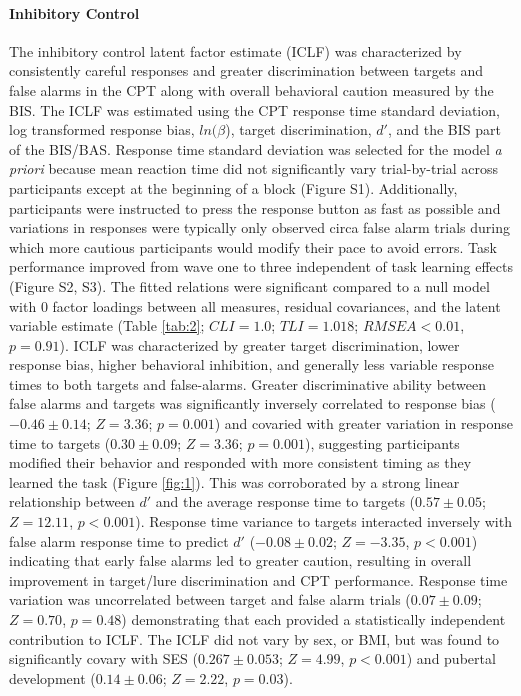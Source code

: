 \documentclass[utf8]{frontiersSCNS} %
\begin{document}
\paragraph{Inhibitory Control} 
The inhibitory control latent factor estimate (ICLF) was characterized by consistently careful responses and greater discrimination between targets and false alarms in the CPT along with overall behavioral caution measured by the BIS. The ICLF  was estimated using the CPT response time standard deviation, log transformed response bias, $ln(\beta$), target discrimination, $d'$, and the BIS part of the BIS/BAS. Response time standard deviation was selected for the model \textit{a priori} because mean reaction time did not significantly vary trial-by-trial across participants except at the beginning of a block (Figure S1). Additionally, participants were instructed to press the response button as fast as possible and variations in responses were typically only observed circa false alarm trials during which more cautious participants would modify their pace to avoid errors. Task performance improved from wave one to three independent of task learning effects (Figure S2, S3). The fitted relations were significant compared to a null model with 0 factor loadings between all measures, residual covariances, and the latent variable estimate (Table \ref{tab:2}; $CLI = 1.0$; $TLI = 1.018$; $RMSEA < 0.01$, $p = 0.91$). ICLF was characterized by greater target discrimination, lower response bias, higher behavioral inhibition, and generally less variable response times to both targets and false-alarms. Greater discriminative ability between false alarms and targets was significantly inversely correlated to response bias ($-0.46\pm0.14$; $Z=3.36$; $p=0.001$) and covaried with greater variation in response time to targets ($0.30\pm0.09$; $Z=3.36$; $p=0.001$), suggesting participants modified their behavior and responded with more consistent timing as they learned the task (Figure \ref{fig:1}). This was corroborated by a strong linear relationship between $d'$ and the average response time to targets ($0.57\pm0.05$; $Z=12.11$, $p<0.001$). Response time variance to targets interacted inversely with false alarm response time to predict $d'$ ($-0.08\pm0.02$;  $Z=-3.35$, $p < 0.001$) indicating that early false alarms led to greater caution, resulting in overall improvement in target/lure discrimination and CPT performance. Response time variation was uncorrelated between target and false alarm trials ($0.07\pm0.09$; $Z=0.70$, $p=0.48$) demonstrating that each provided a statistically independent contribution to ICLF. The ICLF did not vary by sex, or BMI, but was found to significantly covary with SES ($0.267\pm0.053$; $Z=4.99$, $p<0.001$) and pubertal development ($0.14\pm0.06$; $Z=2.22$, $p=0.03$). 
\end{document}
